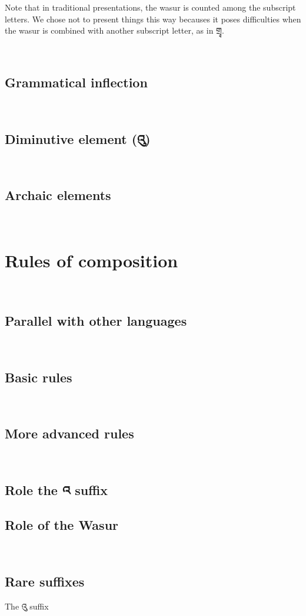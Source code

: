 \documentclass[%
a4paper,%
pagesize,%
12pt,%
parskip=off,%
bibliography=totoc,%
numbers=noenddot,%
DIV=12,%
twoside=semi,%
headings=normal%
]{scrartcl}
\begin{document}
Note that in traditional presentations, the wasur is counted among the subscript letters. We chose not to present things this way becauses it poses difficulties when the wasur is combined with another subscript letter, as in གྲྭ.

­\subsection{Grammatical inflection}

­\subsection{Diminutive element (འུ)} 

­\subsection{Archaic elements}

­\section{Rules of composition}

­\subsection{Parallel with other languages}

­\subsection{Basic rules}

­\subsection{More advanced rules}

­\subsection{Role the འ suffix}

\subsection{Role of the Wasur}

­\subsection{Rare suffixes}
The འུ suffix
\end{document}
